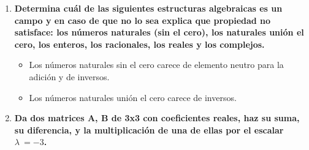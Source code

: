 \documentclass{report}
\begin{document}
\begin{enumerate} 
\item {\bfseries 
Determina cuál de las siguientes estructuras algebraicas es un campo y en caso de que no lo sea explica que propiedad no satisface: los números naturales (sin el cero), los naturales unión el cero, los enteros, los racionales, los reales y los complejos.}
\begin{itemize}
\item Los números naturales sin el cero carece de elemento neutro para la adición y de inversos.
\item Los números naturales unión el cero carece de inversos.
\end{itemize}
\item {\bfseries 
Da dos matrices A, B de 3x3 con coeficientes reales, haz su suma, su diferencia, y la multiplicación de una de ellas por el escalar $\lambda\  = -3$.}


\end{enumerate}
\end{document}
